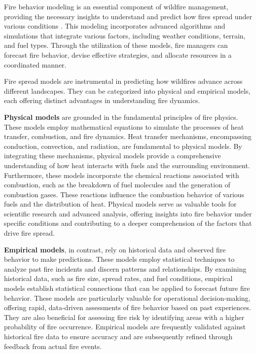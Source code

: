 \documentclass[
  12 pt,
]{Nemilov}
\begin{document}
Fire behavior modeling is an essential component of wildfire management, providing the necessary insights to understand and predict how fires spread under various conditions \citep{or2023review}. This modeling incorporates advanced algorithms and simulations that integrate various factors, including weather conditions, terrain, and fuel types. Through the utilization of these models, fire managers can forecast fire behavior, devise effective strategies, and allocate resources in a coordinated manner.

Fire spread models are instrumental in predicting how wildfires advance across different landscapes. They can be categorized into physical and empirical models, each offering distinct advantages in understanding fire dynamics.

\textbf{Physical models} are grounded in the fundamental principles of fire physics. These models employ mathematical equations to simulate the processes of heat transfer, combustion, and fire dynamics. Heat transfer mechanisms, encompassing conduction, convection, and radiation, are fundamental to physical models. By integrating these mechanisms, physical models provide a comprehensive understanding of how heat interacts with fuels and the surrounding environment. Furthermore, these models incorporate the chemical reactions associated with combustion, such as the breakdown of fuel molecules and the generation of combustion gases. These reactions influence the combustion behavior of various fuels and the distribution of heat. Physical models serve as valuable tools for scientific research and advanced analysis, offering insights into fire behavior under specific conditions and contributing to a deeper comprehension of the factors that drive fire spread.

\textbf{Empirical models}, in contrast, rely on historical data and observed fire behavior to make predictions. These models employ statistical techniques to analyze past fire incidents and discern patterns and relationships. By examining historical data, such as fire size, spread rates, and fuel conditions, empirical models establish statistical connections that can be applied to forecast future fire behavior. These models are particularly valuable for operational decision-making, offering rapid, data-driven assessments of fire behavior based on past experiences. They are also beneficial for assessing fire risk by identifying areas with a higher probability of fire occurrence. Empirical models are frequently validated against historical fire data to ensure accuracy and are subsequently refined through feedback from actual fire events.
\end{document}
